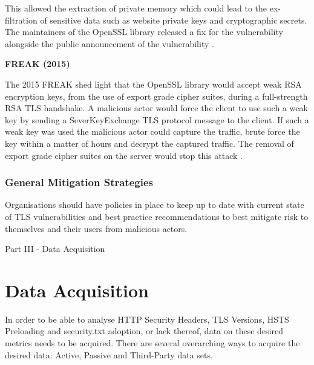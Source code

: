 \documentclass{mscreport}
\begin{document}
\vspace{0.3cm} \noindent
This allowed the extraction of private memory which could lead to the ex-filtration of sensitive data such as website private keys and cryptographic secrets. The maintainers of the OpenSSL library released a fix for the vulnerability alongside the public announcement of the vulnerability \cite{Durumeric2014-yj}.

\vspace{0.6cm} \noindent
\textbf{FREAK (2015)}

\vspace{0.2cm} \noindent
The 2015 FREAK shed light that the OpenSSL library would accept weak RSA encryption keys, from the use of export grade cipher suites, during a full-strength RSA TLS handshake. A malicious actor would force the client to use such a weak key by sending a SeverKeyExchange TLS protocol message to the client. If such a weak key was used the malicious actor could capture the traffic, brute force the key within a matter of hours and decrypt the captured traffic. The removal of export grade cipher suites on the server would stop this attack \cite{Ristic2017-aj,Beurdouche2015-ga}.

\subsubsection{General Mitigation Strategies}

Organisations should have policies in place to keep up to date with current state of TLS vulnerabilities and best practice recommendations to best mitigate risk to themselves and their users from malicious actors.

\newpage

\vspace*{\fill}
\begin{center}
\begin{huge}
Part III - Data Acquisition 
\end{huge}
\end{center}
\vspace{\fill}

\newpage

\section{Data Acquisition}
\label{section:data_aquisition}

In order to be able to analyse HTTP Security Headers, TLS Versions, HSTS Preloading and security.txt adoption, or lack thereof, data on these desired metrics needs to be acquired. There are several overarching ways to acquire the desired data: Active, Passive and Third-Party data sets.
\end{document}
